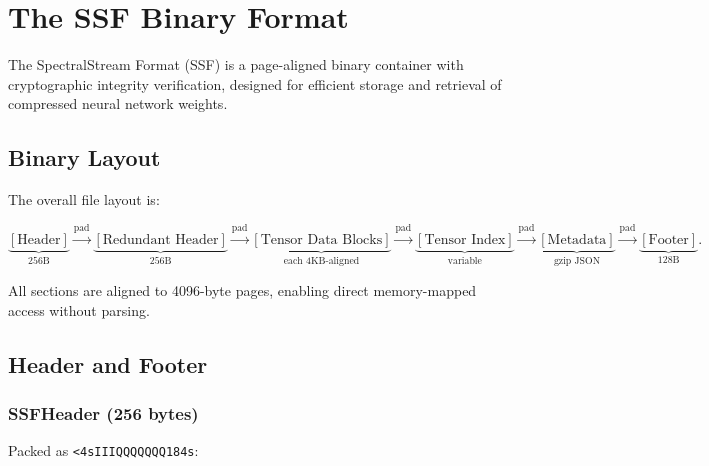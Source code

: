 \documentclass[11pt,a4paper,openright]{book}
\begin{document}
\chapter{The SSF Binary Format}
\label{ch:format}

The SpectralStream Format (SSF) is a page-aligned binary container with cryptographic integrity verification, designed for efficient storage and retrieval of compressed neural network weights.

\section{Binary Layout}

The overall file layout is:

\begin{equation}
	\label{eq:ssf_layout}
	\underbrace{[\text{Header}]}_{256\text{B}}
	\xrightarrow{\text{pad}}
	\underbrace{[\text{Redundant Header}]}_{256\text{B}}
	\xrightarrow{\text{pad}}
	\underbrace{[\text{Tensor Data Blocks}]}_{\text{each 4KB-aligned}}
	\xrightarrow{\text{pad}}
	\underbrace{[\text{Tensor Index}]}_{\text{variable}}
	\xrightarrow{\text{pad}}
	\underbrace{[\text{Metadata}]}_{\text{gzip JSON}}
	\xrightarrow{\text{pad}}
	\underbrace{[\text{Footer}]}_{128\text{B}}.
\end{equation}

All sections are aligned to 4096-byte pages, enabling direct memory-mapped access without parsing.

\section{Header and Footer}

\subsection{SSFHeader (256 bytes)}

Packed as \texttt{<4sIIIQQQQQQQ184s}:
\end{document}
